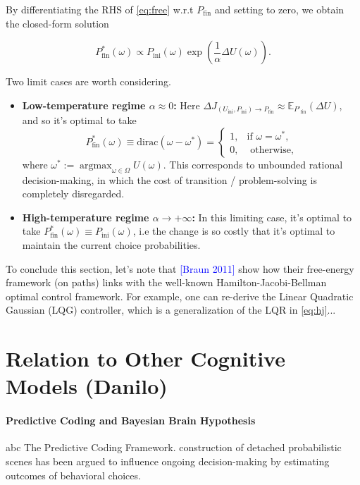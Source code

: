 \documentclass{article} %
\DeclareMathOperator{\argmax}{argmax}
\begin{document}
By differentiating the RHS of \eqref{eq:free} w.r.t $P_{\text{fin}}$ and setting to zero, we obtain the closed-form solution

\begin{equation}
  P^*_{\text{fin}}(\omega) \propto P_{\text{ini}}(\omega)\exp\left(\frac{1}{\alpha}\Delta U(\omega)\right).
\end{equation}

Two limit cases are worth considering.
\begin{itemize}
\item \textbf{Low-temperature regime $\alpha \approx 0$:} Here $\Delta J_{(U_{\text{ini}}, P_{\text{ini}}) \rightarrow P_{\text{fin}}} \approx \mathbb E_{P'_{\text{fin}}}(\Delta U)$, and so it's optimal to take
  $$P^*_{\text{fin}}(\omega) \equiv \text{dirac}(\omega - \omega^*) = \begin{cases}1, &\mbox{if }\omega = \omega^*,\\0, &\mbox{ otherwise,}\end{cases}$$
  where $\omega^* := \argmax_{\omega \in \Omega}U(\omega)$. This corresponds to unbounded rational decision-making, in which the cost of transition / problem-solving is completely disregarded.
  \item \textbf{High-temperature regime $\alpha \rightarrow +\infty$:} In this limiting case, it's optimal to take $P^*_{\text{fin}}(\omega) \equiv P_{\text{ini}}(\omega)$, i.e the change is so costly that it's optimal to maintain the current choice probabilities.
\end{itemize}

To conclude this section, let's note that \textcolor{blue}{[Braun 2011]} show how their free-energy framework (on paths) links with the well-known Hamilton-Jacobi-Bellman optimal control framework. For example, one can re-derive the Linear Quadratic Gaussian (LQG) controller, which is a generalization of the LQR in \eqref{eq:hj}...


\section{Relation to Other Cognitive Models (Danilo)}
\paragraph{Predictive Coding and Bayesian Brain Hypothesis}
abc
The Predictive Coding Framework.
construction of detached probabilistic scenes has been argued to influence ongoing decision-making by estimating outcomes of behavioral choices.
\end{document}
